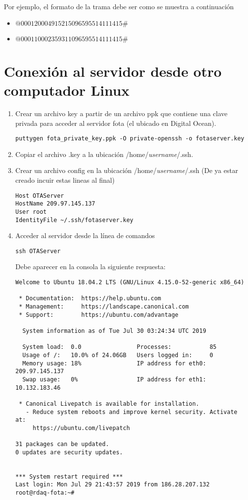 \documentclass[11pt]{article}
\begin{document}
Por ejemplo, el formato de la trama debe ser como se muestra a continuación
\begin{itemize}
\item $@000120004915215096595514111415\#$
\item $@000110002359311096595514111415\#$
\end{itemize}   

\section{Conexión al servidor desde otro computador Linux}
\begin{enumerate}
\item Crear un archivo key a partir de un archivo ppk que contiene una clave privada para acceder al servidor fota (el ubicado en Digital Ocean).

\begin{verbatim}
puttygen fota_private_key.ppk -O private-openssh -o fotaserver.key
\end{verbatim}

\item Copiar el archivo .key a la ubicación /home/\emph{username}/.ssh.

\item Crear un archivo config en la ubicación /home/\emph{username}/.ssh (De ya estar creado incuir estas lineas al final)

\begin{verbatim}
Host OTAServer
HostName 209.97.145.137
User root
IdentityFile ~/.ssh/fotaserver.key
\end{verbatim}

\item Acceder al servidor desde la línea de comandos
\begin{verbatim}
ssh OTAServer
\end{verbatim}
Debe aparecer en la consola la siguiente respuesta:
\begin{verbatim}
Welcome to Ubuntu 18.04.2 LTS (GNU/Linux 4.15.0-52-generic x86_64)

 * Documentation:  https://help.ubuntu.com
 * Management:     https://landscape.canonical.com
 * Support:        https://ubuntu.com/advantage

  System information as of Tue Jul 30 03:24:34 UTC 2019

  System load:  0.0                Processes:           85
  Usage of /:   10.0% of 24.06GB   Users logged in:     0
  Memory usage: 18%                IP address for eth0: 209.97.145.137
  Swap usage:   0%                 IP address for eth1: 10.132.183.46

 * Canonical Livepatch is available for installation.
   - Reduce system reboots and improve kernel security. Activate at:
     https://ubuntu.com/livepatch

31 packages can be updated.
0 updates are security updates.


*** System restart required ***
Last login: Mon Jul 29 21:43:57 2019 from 186.28.207.132
root@rdaq-fota:~# 
\end{verbatim}
\end{enumerate}
\end{document}
